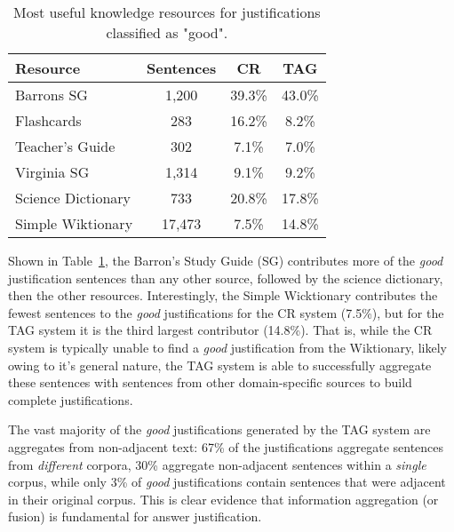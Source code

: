 %
%
\begin{table}[t]
\caption{{ \label{font-table} Most useful knowledge resources for justifications classified as "good".}}
\small
\begin{center}
\begin{tabular}{lccc}
\hline
\multicolumn{1}{l}{Resource} & \multicolumn{1}{c}{Sentences} &\multicolumn{1}{c}{CR} & \multicolumn{1}{c}{TAG}  \\
\cline{2-3}
\hline
Barrons SG 			& 1,200		&	39.3\%		& 43.0\%	\\
Flashcards			& 283		&	16.2\%		& 8.2\%	\\
Teacher's Guide		& 302		&	7.1\%		& 7.0\%	\\
Virginia SG			& 1,314		&	9.1\%		& 9.2\%	\\
Science Dictionary	& 733		&	20.8\%		& 17.8\%	\\
Simple Wiktionary	& 17,473		&	7.5\%		& 14.8\%	\\

\end{tabular}

\label{tab:justificationknowledgeresources}
\end{center}
\end{table}

{} Shown in Table~\ref{tab:justificationknowledgeresources}, the Barron's Study Guide (SG) contributes more of the \emph{good} justification sentences than any other source, followed by the science dictionary, then the other resources.  Interestingly, the Simple Wicktionary contributes the fewest sentences to the \emph{good} justifications for the CR system (7.5\%), but for the TAG system it is the third largest contributor (14.8\%).  That is, while the CR system is typically unable to find a \emph{good} justification from the Wiktionary, likely owing to it's general nature, the TAG system is able to successfully aggregate these sentences with sentences from other domain-specific sources to build complete justifications.

The vast majority of the \emph{good} justifications generated by the TAG system are aggregates from non-adjacent text: 67\% of the justifications aggregate sentences from \emph{different} corpora, 30\% aggregate non-adjacent sentences within a \emph{single} corpus, while only 3\% of \emph{good} justifications contain sentences that were adjacent in their original corpus. 
This is clear evidence that information aggregation (or fusion) is fundamental for answer justification.


